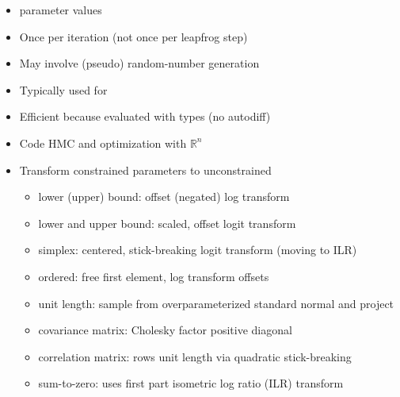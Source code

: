 \documentclass[10pt]{report}
\begin{document}
%
\begin{itemize}
\item {} parameter values
\item Once per iteration (not once per leapfrog step)
\item May involve (pseudo) random-number generation
\item Typically used for
\item Efficient because evaluated with  types (no autodiff)
\end{itemize}


%
\begin{itemize}
\item Code HMC and optimization with $\mathbb{R}^n$ 
\item Transform constrained parameters to unconstrained
  \vspace*{-2pt}
  {\small
    \begin{itemize}
    \item lower (upper) bound: offset (negated) log transform
    \item lower and upper bound: scaled, offset logit transform
    \item simplex: centered, stick-breaking logit transform (moving to ILR)
    \item ordered: free first element, log transform offsets
    \item unit length: sample from overparameterized standard normal and project
    \item covariance matrix: Cholesky factor positive diagonal
    \item correlation matrix: rows unit length via quadratic stick-breaking
    \item sum-to-zero: uses first part isometric log ratio (ILR) transform
    \end{itemize}
  }
\end{itemize}
\end{document}
